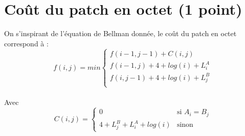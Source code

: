 \documentclass[a4paper,10pt,french]{article}
\begin{document}
\section{Coût du patch en octet (1 point)}
On s'inspirant de l'équation de Bellman donnée, le coût du patch en octet correspond à :\\
$$
f(i,j) = min\left\{
    \begin{array}{ll}
        f(i-1,j-1) + C(i,j)\\
        f(i-1,j) + 4 + log(i) + L^A_i\\
        f(i,j-1) + 4 + log(i) + L^B_j\\
    \end{array}
\right.
$$\\
Avec  
$$
C(i,j) = \left\{
    \begin{array}{ll}
        0 & \mbox{si } A_i = B_j\\
        4 + L^B_j + L^A_i + log(i) & \mbox{sinon }
    \end{array}
\right.
$$\\
\end{document}
